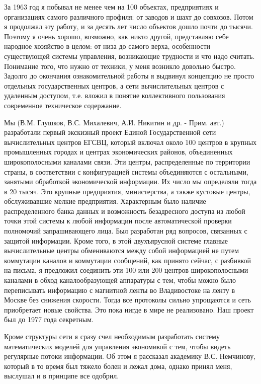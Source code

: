 За 1963 год я побывал не менее чем на 100 объектах, предприятиях и организациях
самого различного профиля: от заводов и шахт до совхозов. Потом я продолжал эту
работу, и за десять лет число объектов дошло почти до тысячи. Поэтому я очень
хорошо, возможно, как никто другой, представляю себе народное хозяйство в целом:
от низа до самого верха, особенности существующей системы управления,
возникающие трудности и что надо считать. Понимание того, что нужно от техники,
у меня возникло довольно быстро. Задолго до окончания ознакомительной работы я
выдвинул концепцию не просто отдельных государственных центров, а сети
вычислительных центров с удаленным доступом, т.е. вложил в понятие коллективного
пользования современное техническое содержание.

Мы (В.М. Глушков, В.С. Михалевич, А.И. Никитин и др. - Прим. авт.) разработали
первый экскизный проект Единой Государственной сети вычислительных центров
ЕГСВЦ, который включал около 100 центров в крупных промышленных городах и
центрах экономических районов, объединенных широкополосными каналами связи. Эти
центры, распределенные по территории страны, в соответствии с конфигурацией
системы объединяются с остальными, занятыми обработкой экономической информации.
Их число мы определяли тогда в 20 тысяч. Это крупные предприятия, министерства,
а также кустовые центры, обслуживавшие мелкие предприятия. Характерным было
наличие распределенного банка данных и возможность безадресного доступа из любой
точки этой системы к любой информации после автоматической проверки полномочий
запрашивающего лица. Был разработан ряд вопросов, связанных с защитой
информации. Кроме того, в этой двухъярусной системе главные вычислительные
центры обмениваются между собой информацией не путем коммутации каналов и
коммутации сообщений, как принято сейчас, с разбивкой на письма, я предложил
соединить эти 100 или 200 центров широкополосными каналами в обход
каналообразующей аппаратуры с тем, чтобы можно было переписывать информацию с
магнитной ленты во Владивостоке на ленту в Москве без снижения скорости. Тогда
все протоколы сильно упрощаются и сеть приобретает новые свойства. Это пока
нигде в мире не реализовано. Наш проект был до 1977 года секретным.

Кроме структуры сети я сразу счел необходимым разработать систему математических
моделей для управления экономикой с тем, чтобы видеть регулярные потоки
информации. Об этом я рассказал академику В.С. Немчинову, который в то время был
тяжело болен и лежал дома, однако принял меня, выслушал и в принципе все
одобрил.

